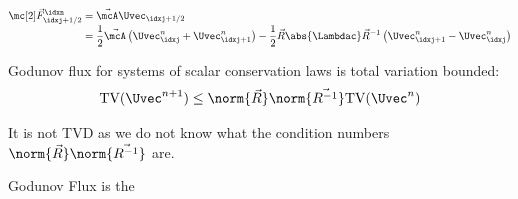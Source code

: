 \begin{defnbox}\nospacing
    \begin{defn}\label{defn:gudonov_flux_systems}
        \begin{align}
          \Fluxvec_{\idxj+1/2}^{\idxn}&=\linfluxvec\Uvec_{\idxj+1/2}\\[-1\jot]
          &=\frac{1}{2}\linfluxvec \left(\Uvec_{\idxj}^{n}+\Uvec_{\idxj+1}^{n}\right)-\frac{1}{2}\vec{R}\abs{\Lambdac}\vec{R}^{-1}\left(\Uvec_{\idxj+1}^{n}-\Uvec_{\idxj}^{n}\right)\nonumber
        \end{align}
    \end{defn}
\end{defnbox}
\begin{propertybox}\nospacing
    \begin{property}\label{property:total_variation_bounded}
        Godunov flux for systems of scalar conservation laws is total variation bounded:
        \begin{align}
          \text{TV}(\Uvec^{n+1})\leq\norm{\vec{R}}\norm{\vec{R^{-1}}}\text{TV}(\Uvec^{n})
        \end{align}
    \end{property}
\end{propertybox}
\begin{notebox}[Note]\nospacing
    It is not TVD as we do not know what the condition numbers $\norm{\vec{R}}\norm{\vec{R^{-1}}}$ are.
\end{notebox}
Godunov Flux is the
